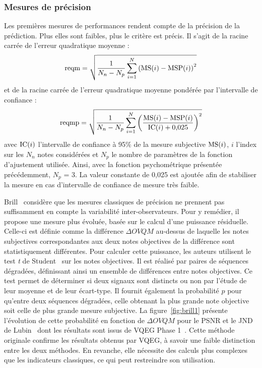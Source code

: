 \subsubsection{Mesures de précision}
Les premières mesures de performances rendent compte de la précision de la prédiction. Plus elles sont faibles, plus le critère est précis. Il s'agit de la racine carrée de l'erreur quadratique moyenne :
\begin{equation}
\text{reqm} = \sqrt{\dfrac{1}{N_n - N_p} \sum\limits_{i=1}^N \left(\text{MS}(i) - \text{MSP}(i) \right)^2}
\end{equation}
%
et de la racine carrée de l'erreur quadratique moyenne pondérée par l'intervalle de confiance :
\begin{equation}
\text{reqmp} = \sqrt{\dfrac{1}{N_n - N_p} \sum\limits_{i=1}^N \left( \dfrac{\text{MS}(i) - \text{MSP}(i)}{\text{IC}(i) + \text{0,025}} \right)^2}
\end{equation}
%
avec $\text{IC}(i)$ l'intervalle de confiance à 95\% de la mesure subjective $\text{MS}(i)$, $i$ l'index sur les $N_n$ notes considérées et $N_p$ le nombre de paramètres de la fonction d'ajustement utilisée. Ainsi, avec la fonction psychométrique présentée précédemment, $N_p$ = 3. La valeur constante de 0,025 est ajoutée afin de stabiliser la mesure en cas d'intervalle de confiance de mesure très faible.

Brill~\cite{brill-spic} considère que les mesures classiques de précision ne prennent pas suffisamment en compte la variabilité inter-observateurs. Pour y remédier, il propose une mesure plus évoluée, basée sur le calcul d'une puissance résiduelle. Celle-ci est définie comme la différence $\Delta \mathit{OVQM}$ au-dessus de laquelle les notes subjectives correspondantes aux deux notes objectives de la différence sont statistiquement différentes. Pour calculer cette puissance, les auteurs utilisent le test \emph{t} de Student~\cite{gosset-biometrika} sur les notes objectives. Il est réalisé par paires de séquences dégradées, définissant ainsi un ensemble de différences entre notes objectives. Ce test permet de déterminer si deux signaux sont distincts ou non par l’étude de leur moyenne et de leur écart-type. Il fournit également la probabilité $p$ pour qu'entre deux séquences dégradées, celle obtenant la plus grande note objective soit celle de plus grande mesure subjective. La figure~\ref{fig:brill1} présente l'évolution de cette probabilité en fonction de $\Delta \mathit{OVQM}$ pour le PSNR et le JND de Lubin~\cite{lubin-jnd} dont les résultats sont issus de VQEG Phase 1~\cite{vqeg-frtv1}. Cette méthode originale confirme les résultats obtenus par VQEG, à savoir une faible distinction entre les deux méthodes. En revanche, elle nécessite des calculs plus complexes que les indicateurs classiques, ce qui peut restreindre son utilisation.

